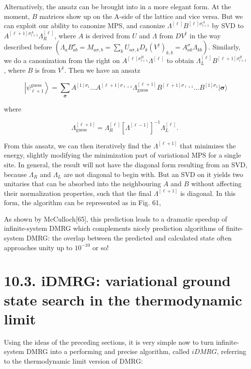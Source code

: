 \documentclass[12pt]{article}
\begin{document}
Alternatively, the ansatz can be brought into in a more elegant form. At the moment, $B$ matrices show up on the A-side of the lattice and vice versa. But we can exploit our ability to canonize MPS, and canonize $\Lambda^{[\ell]} B^{[\ell] \sigma_{l+1}^{A}}$ by SVD to $A^{[\ell+1] \sigma_{l+1}^{A}} \Lambda_{R}^{[\ell]}$, where $A$ is derived from $U$ and $\Lambda$ from $D V^{\dagger}$ in the way described before $\left(\Lambda_{a} B_{a b}^{\sigma}=M_{a \sigma, b}=\sum_{k} U_{a \sigma, k} D_{k}\left(V^{\dagger}\right)_{k, b}=A_{a k}^{\sigma} \Lambda_{k b}\right)$. Similarly, we do a canonization from the right on $A^{[\ell] \sigma_{l+1}^{B}} \Lambda^{[\ell]}$ to obtain $\Lambda_{L}^{[\ell]} B^{[\ell+1] \sigma_{l+1}^{B}}$, where $B$ is from $V^{\dagger}$. Then we have an ansatz


\begin{equation*}
\left|\psi_{\ell+1}^{\text {guess }}\right\rangle=\sum_{\boldsymbol{\sigma}} A^{[1] \sigma_{1}} \ldots A^{[\ell+1] \sigma_{\ell+1}} \Lambda_{\text {guess }}^{[\ell+1]} B^{[\ell+1] \sigma_{\ell+1}} \ldots B^{[1] \sigma_{1}}|\boldsymbol{\sigma}\rangle \tag{339}
\end{equation*}


where


\begin{equation*}
\Lambda_{\text {guess }}^{[\ell+1]}=\Lambda_{R}^{[\ell]}\left[\Lambda^{[\ell-1]}\right]^{-1} \Lambda_{L}^{[\ell]} \text {. } \tag{340}
\end{equation*}


From this ansatz, we can then iteratively find the $\Lambda^{[\ell+1]}$ that minimizes the energy, slightly modifying the minimization part of variational MPS for a single site. In general, the result will not have the diagonal form resulting from an SVD, because $\Lambda_{R}$ and $\Lambda_{L}$ are not diagonal to begin with. But an SVD on it yields two unitaries that can be absorbed into the neighbouring $A$ and $B$ without affecting their normalization properties, such that the final $\Lambda^{[\ell+1]}$ is diagonal. In this form, the algorithm can be represented as in Fig. 61,

As shown by McCulloch[65], this prediction leads to a dramatic speedup of infinite-system DMRG which complements nicely prediction algorithms of finite-system DMRG: the overlap between the predicted and calculated state often approaches unity up to $10^{-10}$ or so!

\section*{10.3. iDMRG: variational ground state search in the thermodynamic limit}
Using the ideas of the preceding sections, it is very simple now to turn infinite-system DMRG into a performing and precise algorithm, called $i D M R G$, referring to the thermodynamic limit version of DMRG:
\end{document}
